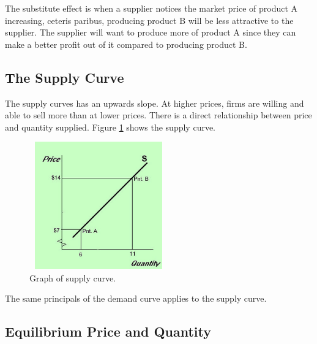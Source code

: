 \documentclass[a4paper, 12pt] {article}
\begin{document}
The substitute effect is when a supplier notices the market price of product A
increasing, ceteris paribus, producing product B will be less attractive to the
supplier. The supplier will want to produce more of product A since they can
make a better profit out of it compared to producing product B.

\subsection{The Supply Curve}
The supply curves has an upwards slope. At higher prices, firms are willing and
able to sell more than at lower prices. There is a direct relationship between
price and quantity supplied. Figure \ref{fig:supply_curve} shows the supply curve.
\begin{figure}[h]
    \centering
    \includegraphics[height=5.5cm, width=6cm]{supply_demand_curve.jpg}
    \caption{Graph of supply curve.}
    \label{fig:supply_curve}
\end{figure}

The same principals of the demand curve applies to the supply curve.

\subsection{Equilibrium Price and Quantity}
\end{document}
